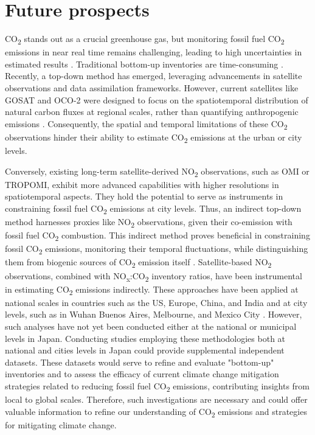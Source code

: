 \section{Future prospects}
CO\textsubscript{2} stands out as a crucial greenhouse gas, but monitoring fossil fuel CO\textsubscript{2} emissions in near real time remains challenging, leading to high uncertainties in estimated results \citep{marland2008uncertainties}. Traditional bottom-up inventories are time-consuming \citep{marland2008uncertainties}. Recently, a top-down method has emerged, leveraging advancements in satellite observations and data assimilation frameworks. However, current satellites like GOSAT and OCO-2 were designed to focus on the spatiotemporal distribution of natural carbon fluxes at regional scales, rather than quantifying anthropogenic emissions \citep{nassar2017quantifying, yang2023using}. Consequently, the spatial and temporal limitations of these CO\textsubscript{2} observations hinder their ability to estimate CO\textsubscript{2} emissions at the urban or city levels. \par

Conversely, existing long-term satellite-derived NO\textsubscript{2} observations, such as OMI or TROPOMI, exhibit more advanced capabilities with higher resolutions in spatiotemporal aspects. They hold the potential to serve as instruments in constraining fossil fuel CO\textsubscript{2} emissions at city levels. Thus, an indirect top-down method harnesses proxies like NO\textsubscript{2} observations, given their co-emission with fossil fuel CO\textsubscript{2} combustion. This indirect method proves beneficial in constraining fossil CO\textsubscript{2} emissions, monitoring their temporal fluctuations, while distinguishing them from biogenic sources of CO\textsubscript{2} emission itself \citep{ciais2014current, goldberg2019exploiting}. Satellite-based NO\textsubscript{2} observations, combined with NO\textsubscript{x}:CO\textsubscript{2} inventory ratios, have been instrumental in estimating CO\textsubscript{2} emissions indirectly. These approaches have been applied at national scales in countries such as the US, Europe, China, and India \citep{konovalov2016estimation, zheng2020satellite, miyazaki2023predictability} and at city levels, such as in Wuhan \citep{zhang2023quantifying} Buenos Aires, Melbourne, and Mexico City \citep{yang2023using}. However, such analyses have not yet been conducted either at the national or municipal levels in Japan. Conducting studies employing these methodologies both at national and cities levels in Japan could provide supplemental independent datasets. These datasets would serve to refine and evaluate "bottom-up" inventories and to assess the efficacy of current climate change mitigation strategies related to reducing fossil fuel CO\textsubscript{2} emissions, contributing insights from local to global scales. Therefore, such investigations are necessary and could offer valuable information to refine our understanding of CO\textsubscript{2} emissions and strategies for mitigating climate change. \par

